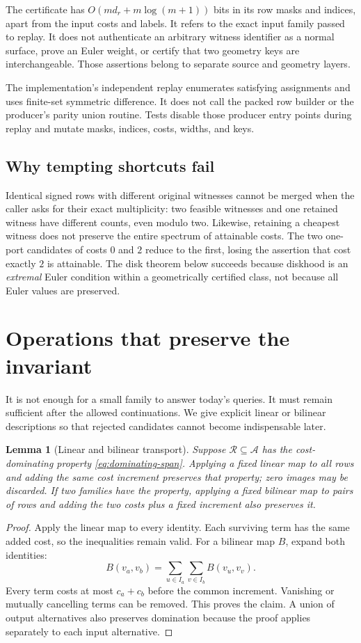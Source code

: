 \documentclass[11pt,letterpaper]{article}
\newtheorem{lemma}[theorem]{Lemma}
\theoremstyle{definition}
\begin{document}
The certificate has $O(md_r+m\log(m+1))$ bits in its row masks and indices, apart from the input costs and labels. It refers to the exact input family passed to replay. It does not authenticate an arbitrary witness identifier as a normal surface, prove an Euler weight, or certify that two geometry keys are interchangeable. Those assertions belong to separate source and geometry layers.

The implementation's independent replay enumerates satisfying assignments and uses finite-set symmetric difference. It does not call the packed row builder or the producer's parity union routine. Tests disable those producer entry points during replay and mutate masks, indices, costs, widths, and keys.

\subsection{Why tempting shortcuts fail}
Identical signed rows with different original witnesses cannot be merged when the caller asks for their exact multiplicity: two feasible witnesses and one retained witness have different counts, even modulo two. Likewise, retaining a cheapest witness does not preserve the entire spectrum of attainable costs. The two one-port candidates of costs $0$ and $2$ reduce to the first, losing the assertion that cost exactly $2$ is attainable. The disk theorem below succeeds because diskhood is an \emph{extremal} Euler condition within a geometrically certified class, not because all Euler values are preserved.

\section{Operations that preserve the invariant}
\label{sec:operations}
It is not enough for a small family to answer today's queries. It must remain sufficient after the allowed continuations. We give explicit linear or bilinear descriptions so that rejected candidates cannot become indispensable later.

\begin{lemma}[Linear and bilinear transport]\label{lem:transport}
Suppose $\mathcal R\subseteq\mathcal A$ has the cost-dominating property \eqref{eq:dominating-span}. Applying a fixed linear map to all rows and adding the same cost increment preserves that property; zero images may be discarded. If two families have the property, applying a fixed bilinear map to pairs of rows and adding the two costs plus a fixed increment also preserves it.
\end{lemma}
\begin{proof}
Apply the linear map to every identity. Each surviving term has the same added cost, so the inequalities remain valid. For a bilinear map $B$, expand both identities:
\[
 B(v_a,v_b)=\sum_{u\in I_a}\sum_{v\in I_b}B(v_u,v_v).
\]
Every term costs at most $c_a+c_b$ before the common increment. Vanishing or mutually cancelling terms can be removed. This proves the claim. A union of output alternatives also preserves domination because the proof applies separately to each input alternative.
\end{proof}
\end{document}
